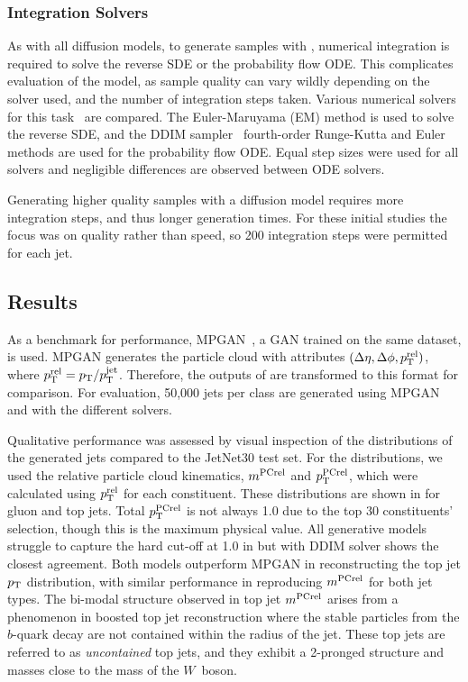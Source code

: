 \subsubsection{Integration Solvers}

As with all diffusion models, to generate samples with \pcjedi, numerical integration is required to solve the reverse SDE or the probability flow ODE.
This complicates evaluation of the model, as sample quality can vary wildly depending on the solver used, and the number of integration steps taken.
Various numerical solvers for this task~\cite{NumericalSolutionStochastic} are compared.
The Euler-Maruyama (EM) method is used to solve the reverse SDE, and the DDIM sampler~\cite{DDIM} fourth-order Runge-Kutta and Euler methods are used for the probability flow ODE.
Equal step sizes were used for all solvers and negligible differences are observed between ODE solvers.

Generating higher quality samples with a diffusion model requires more integration steps, and thus longer generation times.
For these initial studies the focus was on quality rather than speed, so 200 integration steps were permitted for each jet.

\subsection{Results}

As a benchmark for performance, MPGAN~\cite{MPGAN}, a GAN trained on the same dataset, is used.
MPGAN generates the particle cloud with attributes $(\Delta\eta, \Delta\phi, p_\mathrm{T}^\text{rel})$, where $p_\mathrm{T}^\text{rel} = p_\mathrm{T} / p_\mathrm{T}^{\text{jet}}$. Therefore, the outputs of \pcjedi are transformed to this format for comparison.
For evaluation, 50,000 jets per class are generated using MPGAN and \pcjedi with the different solvers.

Qualitative performance was assessed by visual inspection of the distributions of the generated jets compared to the JetNet30 test set.
For the distributions, we used the relative particle cloud kinematics, $m^{\text{PCrel}}$ and $p_\mathrm{T}^{\text{PCrel}}$, which were calculated using $p_\mathrm{T}^\text{rel}$ for each constituent.
These distributions are shown in  for gluon and top jets.
Total $p_\mathrm{T}^{\text{PCrel}}$ is not always 1.0 due to the top 30 constituents' selection, though this is the maximum physical value.
All generative models struggle to capture the hard cut-off at 1.0 in but \pcjedi with DDIM solver shows the closest agreement.
Both \pcjedi models outperform MPGAN in reconstructing the top jet $p_\mathrm{T}$ distribution, with similar performance in reproducing $m^{\text{PCrel}}$ for both jet types.
The bi-modal structure observed in top jet $m^{\text{PCrel}}$ arises from a phenomenon in boosted top jet reconstruction where the stable particles from the $b$-quark decay are not contained within the radius of the jet.
These top jets are referred to as \emph{uncontained} top jets, and they exhibit a 2-pronged structure and masses close to the mass of the $W$~boson.

